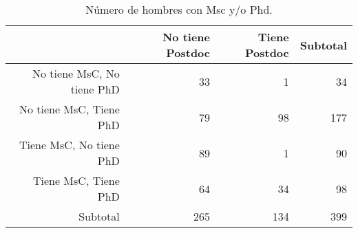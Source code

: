\begin{table}[ht]
\centering
\begin{tabular}{rrrr}
  \hline
 & No tiene Postdoc & Tiene Postdoc & Subtotal \\ 
  \hline
No tiene MsC, No tiene PhD & 33 & 1 & 34 \\ 
  No tiene MsC, Tiene PhD & 79 & 98 & 177 \\ 
  Tiene MsC, No tiene PhD & 89 & 1 & 90 \\ 
  Tiene MsC, Tiene PhD & 64 & 34 & 98 \\ 
  Subtotal & 265 & 134 & 399 \\ 
   \hline
\end{tabular}
\caption{Número de hombres con Msc y/o Phd.} 
\label{tab:counmen}
\end{table}
